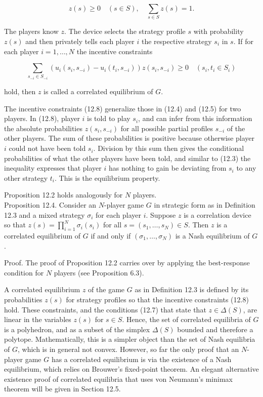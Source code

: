 \documentclass[12pt]{article}
\begin{document}
\begin{equation*}
z(s) \geq 0 \quad(s \in S), \quad \sum_{s \in S} z(s)=1 . \tag{12.7}
\end{equation*}


The players know $z$. The device selects the strategy profile $s$ with probability $z(s)$ and then privately tells each player $i$ the respective strategy $s_{i}$ in $s$. If for each player $i=1, \ldots, N$ the incentive constraints


\begin{equation*}
\sum_{s_{-i} \in S_{-i}}\left(u_{i}\left(s_{i}, s_{-i}\right)-u_{i}\left(t_{i}, s_{-i}\right)\right) z\left(s_{i}, s_{-i}\right) \geq 0 \quad\left(s_{i}, t_{i} \in S_{i}\right) \tag{12.8}
\end{equation*}


hold, then $z$ is called a correlated equilibrium of $G$.

The incentive constraints (12.8) generalize those in (12.4) and (12.5) for two players. In (12.8), player $i$ is told to play $s_{i}$, and can infer from this information the absolute probabilities $z\left(s_{i}, s_{-i}\right)$ for all possible partial profiles $s_{-i}$ of the other players. The sum of these probabilities is positive because otherwise player $i$ could not have been told $s_{i}$. Division by this sum then gives the conditional probabilities of what the other players have been told, and similar to (12.3) the inequality expresses that player $i$ has nothing to gain be deviating from $s_{i}$ to any other strategy $t_{i}$. This is the equilibrium property.

Proposition 12.2 holds analogously for $N$ players.\\
Proposition 12.4. Consider an $N$-player game $G$ in strategic form as in Definition 12.3 and a mixed strategy $\sigma_{i}$ for each player $i$. Suppose $z$ is a correlation device so that $z(s)=\prod_{i=1}^{N} \sigma_{i}\left(s_{i}\right)$ for all $s=\left(s_{1}, \ldots, s_{N}\right) \in S$. Then $z$ is a correlated equilibrium of $G$ if and only if $\left(\sigma_{1}, \ldots, \sigma_{N}\right)$ is a Nash equilibrium of $G$.

Proof. The proof of Proposition 12.2 carries over by applying the best-response condition for $N$ players (see Proposition 6.3).

A correlated equilibrium $z$ of the game $G$ as in Definition 12.3 is defined by its probabilities $z(s)$ for strategy profiles so that the incentive constraints (12.8) hold. These constraints, and the conditions (12.7) that state that $z \in \Delta(S)$, are linear in the variables $z(s)$ for $s \in S$. Hence, the set of correlated equilibria of $G$ is a polyhedron, and as a subset of the simplex $\Delta(S)$ bounded and therefore a polytope. Mathematically, this is a simpler object than the set of Nash equilibria of $G$, which is in general not convex. However, so far the only proof that an $N$-player game $G$ has a correlated equilibrium is via the existence of a Nash equilibrium, which relies on Brouwer's fixed-point theorem. An elegant alternative existence proof of correlated equilibria that uses von Neumann's minimax theorem will be given in Section 12.5.
\end{document}
